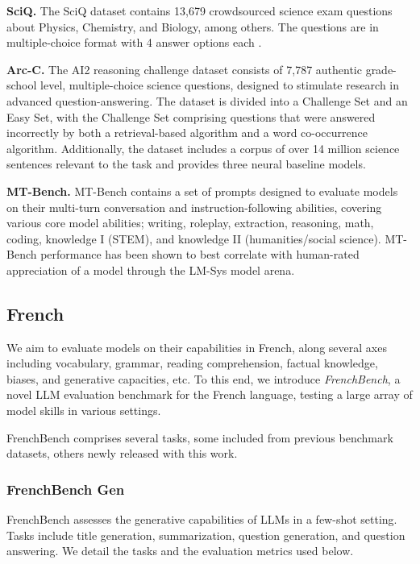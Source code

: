 \textbf{SciQ.} The SciQ dataset contains 13,679 crowdsourced science exam questions about Physics, Chemistry, and Biology, among others. The questions are in multiple-choice format with 4 answer options each .

\textbf{Arc-C.}  The AI2 reasoning challenge dataset  consists of 7,787 authentic grade-school level, multiple-choice science questions, designed to stimulate research in advanced question-answering. The dataset is divided into a Challenge Set and an Easy Set, with the Challenge Set comprising questions that were answered incorrectly by both a retrieval-based algorithm and a word co-occurrence algorithm. Additionally, the dataset includes a corpus of over 14 million science sentences relevant to the task and provides three neural baseline models.

\textbf{MT-Bench.} MT-Bench  contains a set of prompts designed to evaluate models on their multi-turn conversation and instruction-following abilities, covering various core model abilities; writing, roleplay, extraction, reasoning, math, coding, knowledge I (STEM), and knowledge II (humanities/social science). MT-Bench performance has been shown to best correlate with human-rated appreciation of a model through the LM-Sys model arena. 


\subsection{French}
We aim to evaluate models on their capabilities in French, along several axes including vocabulary, grammar, reading comprehension, factual knowledge, biases, and generative capacities, etc.
To this end, we introduce \textit{FrenchBench}, a novel LLM evaluation benchmark for the French language, testing a large array of model skills in various settings.

FrenchBench comprises several tasks, some included from previous benchmark datasets, others newly released with this work. 

\subsubsection{FrenchBench Gen}
FrenchBench assesses the generative capabilities of LLMs in a few-shot setting. Tasks include title generation, summarization, question generation, and question answering. We detail the tasks and the evaluation metrics used below.

